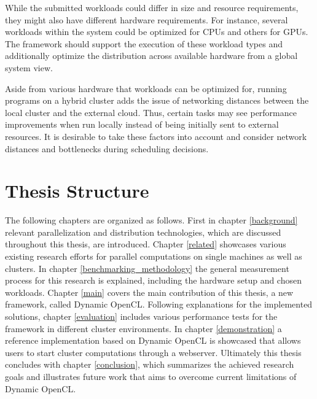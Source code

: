 \begin{description}[style=nextline]
    \item [Workload Diversity]
    While the submitted workloads could differ in size and resource requirements, they might also have different hardware requirements. For instance, several workloads within the system could be optimized for CPUs and others for GPUs. The framework should support the execution of these workload types and additionally optimize the distribution across available hardware from a global system view.

    \item [Optimized Scheduling]
    Aside from various hardware that workloads can be optimized for, running programs on a hybrid cluster adds the issue of networking distances between the local cluster and the external cloud. Thus, certain tasks may see performance improvements when run locally instead of being initially sent to external resources. It is desirable to take these factors into account and consider network distances and bottlenecks during scheduling decisions.

\end{description}


\section*{Thesis Structure}
\label{structure}

The following chapters are organized as follows. First in chapter \ref{background} relevant parallelization and distribution technologies, which are discussed throughout this thesis, are introduced. Chapter \ref{related} showcases various existing research efforts for parallel computations on single machines as well as clusters. In chapter \ref{benchmarking_methodology} the general measurement process for this research is explained, including the hardware setup and chosen workloads. Chapter \ref{main} covers the main contribution of this thesis, a new framework, called Dynamic OpenCL. Following explanations for the implemented solutions, chapter \ref{evaluation} includes various performance tests for the framework in different cluster environments. In chapter \ref{demonstration} a reference implementation based on Dynamic OpenCL is showcased that allows users to start cluster computations through a webserver. Ultimately this thesis concludes with chapter \ref{conclusion}, which summarizes the achieved research goals and illustrates future work that aims to overcome current limitations of Dynamic OpenCL.
